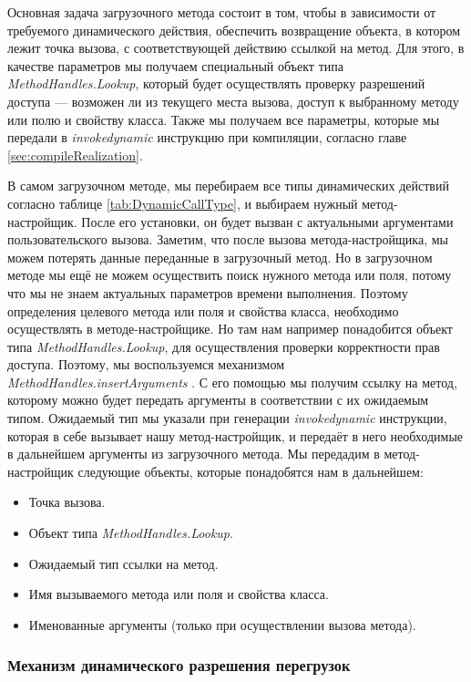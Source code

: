 Основная задача загрузочного метода состоит в том, чтобы в зависимости от требуемого динамического действия, обеспечить возвращение объекта, в котором лежит точка вызова, с соответствующей действию ссылкой на метод. Для этого, в качестве параметров мы получаем специальный объект типа \textit{MethodHandles.Lookup}, который будет осуществлять проверку разрешений доступа --- возможен ли из текущего места вызова, доступ к выбранному методу или полю и свойству класса. Также мы получаем все параметры, которые мы передали в \textit{invokedynamic} инструкцию при компиляции, согласно главе \ref{sec:compileRealization}.

В самом загрузочном методе, мы перебираем все типы динамических  действий согласно таблице \ref{tab:DynamicCallType}, и выбираем нужный метод-настройщик. После его установки, он будет вызван с актуальными аргументами пользовательского вызова. Заметим, что после вызова метода-настройщика, мы можем потерять данные переданные в загрузочный метод. Но в загрузочном методе мы ещё не можем осуществить поиск нужного метода или поля, потому что мы не знаем актуальных параметров времени выполнения. Поэтому определения целевого метода или поля и свойства класса, необходимо осуществлять в методе-настройщике. Но там нам например понадобится объект типа \textit{MethodHandles.Lookup}, для осуществления проверки корректности прав доступа. Поэтому, мы воспользуемся механизмом  \textit{MethodHandles.insertArguments} \cite{javadoc:MethodHandlesLookup}. С его помощью мы получим ссылку на метод, которому можно будет передать аргументы в соответствии с их ожидаемым типом. Ожидаемый тип мы указали при генерации \textit{invokedynamic} инструкции, которая в себе вызывает нашу метод-настройщик, и передаёт в него необходимые в дальнейшем аргументы из загрузочного метода. Мы передадим в метод-настройщик следующие объекты, которые понадобятся нам в дальнейшем:
\begin{itemize}
    \item Точка вызова.
    \item Объект типа \textit{MethodHandles.Lookup}.
    \item Ожидаемый тип ссылки на метод.
    \item Имя вызываемого метода или поля и свойства класса.
    \item Именованные аргументы (только при осуществлении вызова метода).
\end{itemize}


\subsubsection{Механизм динамического разрешения перегрузок}
\label{realization:dynamicResolve}

